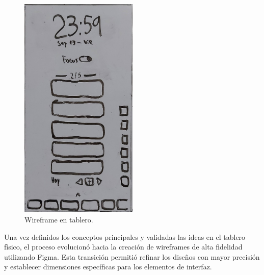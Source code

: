 \begin{figure}[H]
  \caption{Wireframe en tablero.}
  \label{fig:wireframe_tablero}
  \includegraphics[width=0.5\textwidth]{Figuras/wireframe.jpg}
  \centering
\end{figure}


Una vez definidos los conceptos principales y validadas las ideas en el tablero físico, el proceso evolucionó hacia la creación de wireframes de alta fidelidad utilizando Figma. Esta transición permitió refinar los diseños con mayor precisión y establecer dimensiones específicas para los elementos de interfaz.

